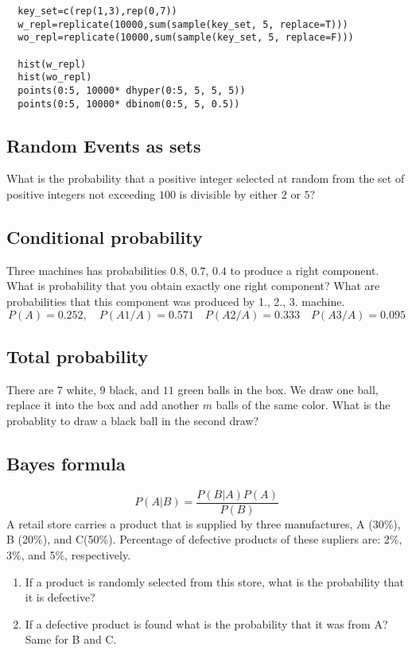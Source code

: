 \documentclass[4pt]{article}
\def\result#1{{\color{green} #1}}
\def\answer#1{}
\begin{document}
\begin{verbatim}  
  key_set=c(rep(1,3),rep(0,7))
  w_repl=replicate(10000,sum(sample(key_set, 5, replace=T)))
  wo_repl=replicate(10000,sum(sample(key_set, 5, replace=F)))
  
  hist(w_repl)
  hist(wo_repl)
  points(0:5, 10000* dhyper(0:5, 5, 5, 5))
  points(0:5, 10000* dbinom(0:5, 5, 0.5))
\end{verbatim}

\subsection{Random Events as sets}
What is the probability that a positive integer selected at random from
the set of positive integers not exceeding $100$ is divisible by either $2$ or $5$?

\answer{
\[
 P(A \vee B) = P(A) + P(B) - P(A.B) = 0.5 + 0.2 - 0.1 = 0.6 
\]
}



\subsection{Conditional probability}
Three machines has probabilities $0.8$, $0.7$, $0.4$ to produce a right component. 
What is probability that you obtain exactly one right component? What are probabilities
that this component was produced by 1., 2., 3. machine. 
\result{
\[
        P(A) = 0.252,\quad 
        P(A1/A) = 0.571\quad
        P(A2/A) = 0.333\quad
        P(A3/A) = 0.095
\]        
}


\subsection{Total probability}
There are $7$ white, $9$ black, and $11$ green balls in the box. We draw one ball, replace it into the box and add another $m$ balls of the same color. 
What is the probablity to draw a black ball in the second draw?
\answer{
\[
    \frac{7}{27}\cdot\frac{9}{27+m}+\frac{9}{27}\cdot\frac{9+m}{27+m}+\frac{11}{27}\cdot\frac{9}{27+m} = \frac{1}{3}
\]    
}

\subsection{Bayes formula}
\[
   P(A|B) = \frac{P(B | A) P(A)}{P(B)} 
\]
A retail store carries a product that is supplied by three manufactures, A (30\%), B (20\%), and C(50\%). 
Percentage of defective products of these supliers are: 2\%, 3\%, and 5\%, respectively.
\begin{enumerate}
 \item If a product is randomly selected from this store, what is the probability that it is
defective? \answer{ $0.3*0.02 +0.2*0.03 + +0.5*0.05 = 0.037$ }
 \item If a defective product is found what is the probability that it was from A? Same for B and C.
 \answer{ $0.162$, $0.162$, $0.676$}
\end{enumerate}
\end{document}
